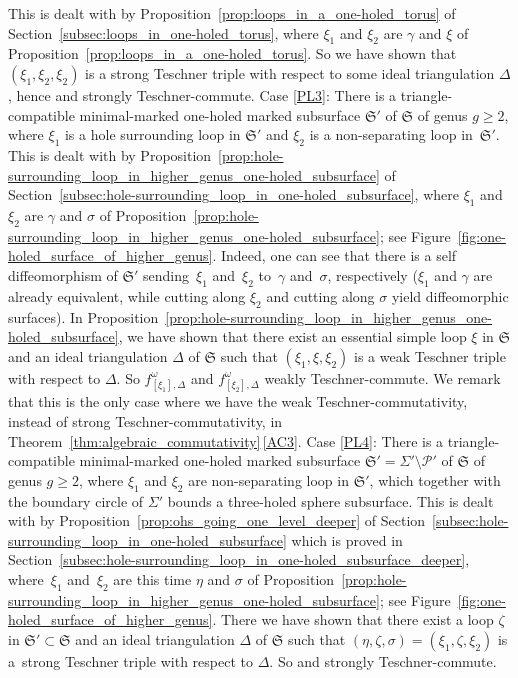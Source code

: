 \documentclass[pdftex]{sigma}
\numberwithin{equation}{section}
\theoremstyle{definition}
\begin{document}
This is dealt with by Proposition~\ref{prop:loops_in_a_one-holed_torus} of Section~\ref{subsec:loops_in_one-holed_torus}, where $\xi_1$ and $\xi_2$ are $\gamma$ and $\xi$ of Proposition~\ref{prop:loops_in_a_one-holed_torus}. So we have shown that $(\xi_1,\xi_2,\xi_2)$ is a strong Teschner triple with respect to some ideal triangulation $\Delta$, hence  and  strongly Teschner-commute.
Case {\ref{PL3}}: There is a triangle-compatible minimal-marked one-holed marked subsurface $\mathfrak{S}'$ of $\mathfrak{S}$ of genus $g\ge 2$, where $\xi_1$ is a hole surrounding loop in $\mathfrak{S}'$ and $\xi_2$ is a non-separating loop in~$\mathfrak{S}'$.
This is dealt with by Proposition~\ref{prop:hole-surrounding_loop_in_higher_genus_one-holed_subsurface} of Section~\ref{subsec:hole-surrounding_loop_in_one-holed_subsurface}, where $\xi_1$ and $\xi_2$ are $\gamma$ and $\sigma$ of Proposition~\ref{prop:hole-surrounding_loop_in_higher_genus_one-holed_subsurface}; see Figure~\ref{fig:one-holed_surface_of_higher_genus}. Indeed, one can see that there is a self diffeomorphism of $\mathfrak{S}'$ sending~$\xi_1$ and~$\xi_2$ to~$\gamma$ and~$\sigma$, respectively ($\xi_1$ and $\gamma$ are already equivalent, while cutting along $\xi_2$ and cutting along $\sigma$ yield diffeomorphic surfaces). In Proposition~\ref{prop:hole-surrounding_loop_in_higher_genus_one-holed_subsurface}, we have shown that there exist an essential simple loop $\xi$ in $\mathfrak{S}$ and an ideal triangulation $\Delta$ of $\mathfrak{S}$ such that $(\xi_1,\xi,\xi_2)$ is a weak Teschner triple with respect to $\Delta$. So $f^\omega_{[\xi_1],\Delta}$ and $f^\omega_{[\xi_2],\Delta}$ weakly Teschner-commute. We remark that this is the only case where we have the weak Teschner-commutativity, instead of strong Teschner-commutativity, in Theorem~\ref{thm:algebraic_commutativity}\,\ref{AC3}.
{\samepage Case {\ref{PL4}}: There is a triangle-compatible minimal-marked one-holed marked subsurface $\mathfrak{S}'=\Sigma'\setminus\mathcal{P}'$ of $\mathfrak{S}$ of genus $g\ge 2$, where $\xi_1$ and $\xi_2$ are non-separating loop in $\mathfrak{S}'$, which together with the boundary circle of $\Sigma'$ bounds a three-holed sphere subsurface.
}
This is dealt with by Proposition~\ref{prop:ohs_going_one_level_deeper} of Section~\ref{subsec:hole-surrounding_loop_in_one-holed_subsurface} which is proved in Section~\ref{subsec:hole-surrounding_loop_in_one-holed_subsurface_deeper}, where~$\xi_1$ and~$\xi_2$ are this time $\eta$ and $\sigma$ of Proposition~\ref{prop:hole-surrounding_loop_in_higher_genus_one-holed_subsurface}; see Figure~\ref{fig:one-holed_surface_of_higher_genus}. There we have shown that there exist a loop $\zeta$ in $\mathfrak{S}' \subset \mathfrak{S}$ and an ideal triangulation $\Delta$ of $\mathfrak{S}$ such that $(\eta,\zeta,\sigma) = (\xi_1,\zeta,\xi_2)$ is a~strong Teschner triple with respect to $\Delta$. So  and  strongly Teschner-commute.
\end{document}
